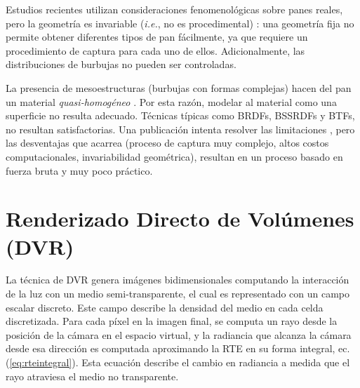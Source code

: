 Estudios recientes utilizan consideraciones fenomenológicas sobre panes reales, pero la geometría es invariable ({\em i.e.}, no es procedimental) \cite{VanDyck2014}: una geometría fija no permite obtener diferentes tipos de pan fácilmente, ya que requiere un procedimiento de captura para cada uno de ellos.
Adicionalmente, las distribuciones de burbujas no pueden ser controladas.

La presencia de mesoestructuras (burbujas con formas complejas) hacen del pan un material {\em quasi-homogéneo} \cite{Tong2005}. 
Por esta razón, modelar al material como una superficie no resulta adecuado.
Técnicas típicas como BRDFs, BSSRDFs \cite{Donner2009} y BTFs, no resultan satisfactorias.
Una publicación intenta resolver las limitaciones \cite{Tong2005}, pero las desventajas que acarrea (proceso de captura muy complejo, altos costos computacionales, invariabilidad geométrica), resultan en un proceso basado en fuerza bruta y muy poco práctico.




\section{Renderizado Directo de Volúmenes (DVR)}

La técnica de DVR genera imágenes bidimensionales computando la interacción de la luz con un medio semi-transparente, el cual es representado con un campo escalar discreto.
Este campo describe la densidad del medio en cada celda discretizada.
Para cada píxel en la imagen final, se computa un rayo desde la posición de la cámara en el espacio virtual, y la radiancia que alcanza la cámara desde esa dirección es computada aproximando la RTE en su forma integral, ec. (\ref{eq:rteintegral}).
Esta ecuación describe el cambio en radiancia a medida que el rayo atraviesa el medio no transparente.

